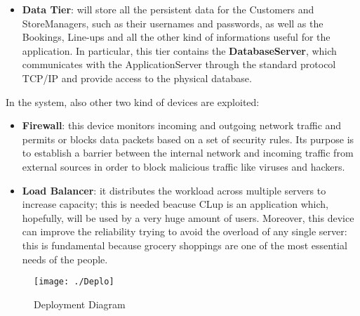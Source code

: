 \begin{itemize}
\begin{itemize}
		\end{itemize}
	\item\textbf{Data Tier}: will store all the persistent data for the Customers and StoreManagers, such as their usernames and passwords, as well as the Bookings, Line-ups and all the other kind of informations useful for the application. In particular, this tier contains the \textbf{DatabaseServer}, which communicates with the ApplicationServer through the standard protocol TCP/IP and provide access to the physical database.\\
\end{itemize}
In the system, also other two kind of devices are exploited:
	\begin{itemize}
			\item\textbf{Firewall}: this device monitors incoming and outgoing network traffic and permits or blocks data packets based on a set of security rules. Its purpose is to establish a barrier between the internal network and incoming traffic from external sources in order to block malicious traffic like viruses and hackers.
			\item\textbf{Load Balancer}: it distributes the workload across multiple servers to increase capacity; this is needed beacuse CLup is an application which, hopefully, will be used by a very huge amount of users. Moreover, this device can improve the reliability trying to avoid the overload of any single server: this is fundamental because grocery shoppings are one of the most essential needs of the people. 
	\end{itemize}


\begin{figure}[H]
\centerline{\texttt{[image: ./Deplo]}}
\caption{Deployment Diagram}
\end{figure}



 
 